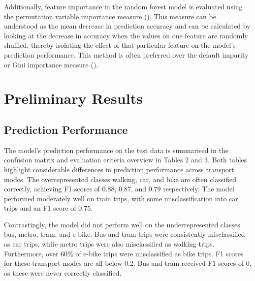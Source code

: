 \documentclass[10pt, a4paper, titlepage, hidelinks]{article}
\begin{document}
Additionally, feature importance in the random forest model is evaluated using the permutation variable importance measure (\cite{altmann2010}). This measure can be understood as the mean decrease in prediction accuracy and can be calculated by looking at the decrease in accuracy when the values on one feature are randomly shuffled, thereby isolating the effect of that particular feature on the model's prediction performance. This method is often preferred over the default impurity or Gini importance measure (\cite{janitza2018}).

\section{Preliminary Results}

\subsection{Prediction Performance}

The model's prediction performance on the test data is summarised in the confusion matrix and evaluation criteria overview in Tables 2 and 3. Both tables highlight considerable differences in prediction performance across transport modes. The overrepresented classes walking, car, and bike are often classified correctly, achieving F1 scores of 0.88, 0.87, and 0.79 respectively. The model performed moderately well on train trips, with some misclassification into car trips and an F1 score of 0.75.

Contrastingly, the model did not perform well on the underrepresented classes bus, metro, tram, and e-bike. Bus and tram trips were consistently misclassified as car trips, while metro trips were also misclassified as walking trips. Furthermore, over 60\% of e-bike trips were misclassified as bike trips. F1 scores for these transport modes are all below 0.2. Bus and tram received F1 scores of 0, as these were never correctly classified.
\end{document}

